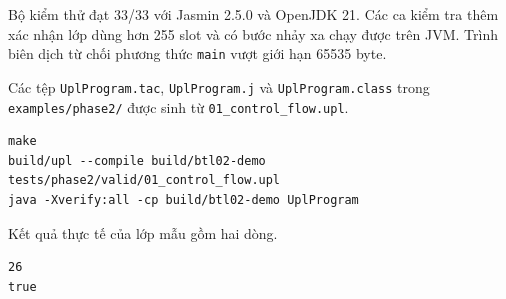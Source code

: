 \documentclass[11pt,a4paper]{article}
\begin{document}
Bộ kiểm thử đạt 33/33 với Jasmin 2.5.0 và OpenJDK 21. Các ca kiểm tra thêm
xác nhận lớp dùng hơn 255 slot và có bước nhảy xa chạy được trên JVM.
Trình biên dịch từ chối phương thức \texttt{main} vượt giới hạn 65535 byte.

Các tệp \texttt{UplProgram.tac}, \texttt{UplProgram.j} và
\texttt{UplProgram.class} trong \texttt{examples/phase2/} được sinh từ
\texttt{01\_control\_flow.upl}.

\begin{lstlisting}[language={}]
make
build/upl --compile build/btl02-demo tests/phase2/valid/01_control_flow.upl
java -Xverify:all -cp build/btl02-demo UplProgram
\end{lstlisting}

Kết quả thực tế của lớp mẫu gồm hai dòng.

\begin{lstlisting}[language={}]
26
true
\end{lstlisting}
\end{document}
